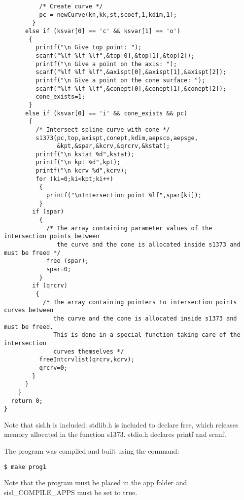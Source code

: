 \begin{verbatim}
          /* Create curve */
          pc = newCurve(kn,kk,st,scoef,1,kdim,1);
        }
      else if (ksvar[0] == 'c' && ksvar[1] == 'o')
       {
         printf("\n Give top point: ");
         scanf("%lf %lf %lf",&top[0],&top[1],&top[2]);
         printf("\n Give a point on the axis: ");
         scanf("%lf %lf %lf",&axispt[0],&axispt[1],&axispt[2]);
         printf("\n Give a point on the cone surface: ");
         scanf("%lf %lf %lf",&conept[0],&conept[1],&conept[2]);
         cone_exists=1;
       }
      else if (ksvar[0] == 'i' && cone_exists && pc)
       {
         /* Intersect spline curve with cone */
         s1373(pc,top,axispt,conept,kdim,aepsco,aepsge,
               &kpt,&spar,&kcrv,&qrcrv,&kstat);
         printf("\n kstat %d",kstat);
         printf("\n kpt %d",kpt);
         printf("\n kcrv %d",kcrv);
         for (ki=0;ki<kpt;ki++)
          {
            printf("\nIntersection point %lf",spar[ki]);
          }
        if (spar)
          {
            /* The array containing parameter values of the intersection points between
               the curve and the cone is allocated inside s1373 and must be freed */
            free (spar);
            spar=0;
          }
        if (qrcrv)
         {
           /* The array containing pointers to intersection points curves between
              the curve and the cone is allocated inside s1373 and must be freed.
              This is done in a special function taking care of the intersection
              curves themselves */
          freeIntcrvlist(qrcrv,kcrv);
          qrcrv=0;
        }
      }
    }
  return 0;
}

\end{verbatim}
Note that sisl.h is included. stdlib.h is included to declare free, which
releases memory allocated in the function s1373. stdio.h declares printf and
scanf.

\bigskip

The program was compiled and built using the command:
\begin{verbatim}
$ make prog1
\end{verbatim}
Note that the program must be placed in the app folder and sisl\_COMPILE\_APPS must be set to true.

